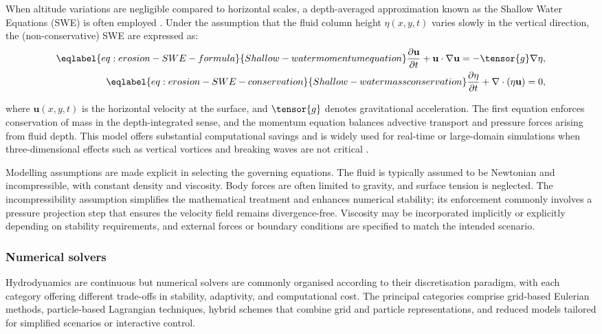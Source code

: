 When altitude variations are negligible compared to horizontal scales, a depth-averaged approximation known as the Shallow Water Equations (SWE) is often employed \cite{Parna2019}. Under the assumption that the fluid column height $\eta(x,y,t)$ varies slowly in the vertical direction, the (non-conservative) SWE are expressed as:
\begin{align}
    \eqlabel{eq:erosion-SWE-formula}{Shallow-water momentum equation}
    \frac{\partial \mathbf{u}}{\partial t} + \mathbf{u} \cdot \nabla \mathbf{u} = - \tensor{g} \nabla \eta, \\
    \eqlabel{eq:erosion-SWE-conservation}{Shallow-water mass conservation}
    \frac{\partial \eta}{\partial t} + \nabla\cdot(\eta \mathbf{u}) = 0,
\end{align}

where $\mathbf{u}(x,y,t)$ is the horizontal velocity at the surface, and $\tensor{g}$ denotes gravitational acceleration.
The first equation enforces conservation of mass in the depth-integrated sense, and the momentum equation balances advective transport and pressure forces arising from fluid depth.
This model offers substantial computational savings and is widely used for real-time or large-domain simulations when three-dimensional effects such as vertical vortices and breaking waves are not critical \cite{Parna2019}.

Modelling assumptions are made explicit in selecting the governing equations. The fluid is typically assumed to be Newtonian and incompressible, with constant density and viscosity. Body forces are often limited to gravity, and surface tension is neglected.
The incompressibility assumption simplifies the mathematical treatment and enhances numerical stability; its enforcement commonly involves a pressure projection step that ensures the velocity field remains divergence-free. Viscosity may be incorporated implicitly or explicitly depending on stability requirements, and external forces or boundary conditions are specified to match the intended scenario.

\subsubsection{Numerical solvers}

Hydrodynamics are continuous but numerical solvers are commonly organised according to their discretisation paradigm, with each category offering different trade-offs in stability, adaptivity, and computational cost. The principal categories comprise grid-based Eulerian methods, particle-based Lagrangian techniques, hybrid schemes that combine grid and particle representations, and reduced models tailored for simplified scenarios or interactive control.

